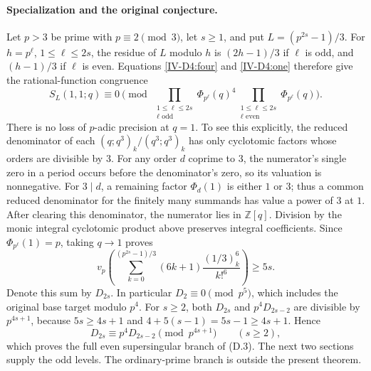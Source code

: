 \documentclass[11pt,letterpaper]{article}
\numberwithin{equation}{section}
\begin{document}
\paragraph{Specialization and the original conjecture.}
Let $p>3$ be prime with $p\equiv2\pmod3$, let $s\ge1$,
and put $L=(p^{2s}-1)/3$.  For $h=p^\ell$, $1\le\ell\le2s$,
the residue of $L$ modulo $h$ is $(2h-1)/3$ if $\ell$ is odd,
and $(h-1)/3$ if $\ell$ is even.  Equations \eqref{IV-D4:four}
and \eqref{IV-D4:one} therefore give the rational-function
congruence
\[
 S_L(1,1;q)\equiv0\pmod{
 \prod_{\substack{1\le\ell\le2s\\\ell\text{ odd}}}\Phi_{p^\ell}(q)^4
 \prod_{\substack{1\le\ell\le2s\\\ell\text{ even}}}\Phi_{p^\ell}(q)}.
\]
There is no loss of $p$-adic precision at $q=1$.
To see this explicitly, the reduced denominator of each
$(q;q^3)_k/(q^3;q^3)_k$ has only cyclotomic factors whose
orders are divisible by $3$.  For any order $d$ coprime to
$3$, the numerator's single zero in a period occurs before
the denominator's zero, so its valuation is nonnegative.
For $3\mid d$, a remaining factor $\Phi_d(1)$ is either $1$
or $3$; thus a common reduced denominator for the finitely
many summands has value a power of $3$ at $1$.
After clearing this denominator, the numerator lies in
$\mathbb Z[q]$.  Division by the monic integral cyclotomic
product above preserves integral coefficients.  Since
$\Phi_{p^\ell}(1)=p$, taking $q\to1$ proves
\begin{equation}\label{IV-D4:valuation}
 \boxed{\quad
 v_p\left(\sum_{k=0}^{(p^{2s}-1)/3}
       (6k+1)\frac{(1/3)_k^6}{k!^6}\right)\ge5s.
 \quad}
\end{equation}
Denote this sum by $D_{2s}$.  In particular $D_2\equiv0\pmod{p^5}$,
which includes the original base target modulo $p^4$.
For $s\ge2$, both $D_{2s}$ and $p^4D_{2s-2}$ are divisible
by $p^{4s+1}$, because $5s\ge4s+1$ and
$4+5(s-1)=5s-1\ge4s+1$.  Hence
\[
 \boxed{D_{2s}\equiv p^4D_{2s-2}\pmod{p^{4s+1}}\qquad(s\ge2),}
\]
which proves the full even supersingular branch of (D.3).
The next two sections supply the odd levels. The ordinary-prime
branch is outside the present theorem.

\end{document}
